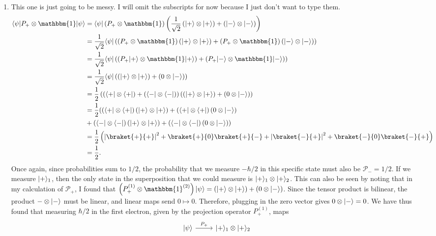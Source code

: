 \documentclass[11pt, letterpaper]{article}
\begin{document}
\begin{enumerate}
	\item This one is just going to be messy. I will omit the subscripts for now because I just don't want to type them.
		\begin{align*}
			\bra{\psi } P_+\otimes \mathbbm{1}\ket{\psi } &=\bra{\psi } \left( P_+ \otimes \mathbbm{1} \right) \left( \frac{1}{\sqrt{2} } \left( \ket{+} \otimes \ket{+} \right) +\left( \ket{-} \otimes \ket{-}  \right)  \right) \\
								      &=\frac{1}{\sqrt{2} } \bra{\psi } \left( \left( P_+\otimes \mathbbm{1} \right) \left( \ket{+} \otimes \ket{+}  \right) + \left( P_+\otimes \mathbbm{1} \right) \left( \ket{-} \otimes \ket{-}  \right)  \right) \\
								      &=\frac{1}{\sqrt{2} } \bra{\psi } \left( \left(P_+\ket{+} \otimes \mathbbm{1}\ket{+}  \right)+\left( P_+\ket{-} \otimes \mathbbm{1}\ket{-}  \right)  \right)\\
								      &=\frac{1}{\sqrt{2} } \bra{\psi } \left(\left( \ket{+} \otimes \ket{+}\right) +\left( 0\otimes \ket{-}  \right)  \right) \\
								      &=\frac{1}{2} \left( \left(\bra{+} \otimes \bra{+} \right)+\left( \bra{-} \otimes \bra{-}  \right)  \right) \left( \left( \ket{+} \otimes \ket{+}  \right) +\left( 0\otimes \ket{-}  \right)  \right) \\
								      &=\frac{1}{2} ( \left( \bra{+} \otimes \bra{+}  \right) \left( \ket{+} \otimes \ket{+}  \right) +\left( \bra{+} \otimes \bra{+}  \right) \left( 0\otimes \ket{-}  \right) \\
								      & +\left( \bra{-} \otimes \bra{-}  \right) \left( \ket{+} \otimes \ket{+}  \right) +\left( \bra{-} \otimes \bra{-}  \right) \left( 0\otimes \ket{-}  \right)  )\\
								      &=\frac{1}{2} \left( \left| \braket{+}{+}  \right|^2+\braket{+}{0} \braket{+}{-} +\left| \braket{-}{+}  \right| ^2+\braket{-}{0} \braket{-}{+}  \right) \\
								      &=\frac{1}{2} 
		.\end{align*}
		Once again, since probabilities sum to $1/2$, the probability that we measure $-\hbar /2$ in this specific state must also be $\mathcal{P}_{-} =1/2$. If we measure $\lvert+\rangle_1$, then the only state in the superposition that we could measure is $\lvert+\rangle_1 \otimes \lvert+\rangle_2$. This can also be seen by noting that in my calculation of $\mathcal{P} _+$, I found that $\left( P_+^{(1)} \otimes \mathbbm{1}^{(2)}  \right) \ket{\psi } =\left( \ket{+} \otimes \ket{+}  \right) +\left( 0\otimes \ket{-}  \right) $. Since the tensor product is bilinear, the product $-\otimes \lvert-\rangle $ must be linear, and linear maps send $0\mapsto 0$. Therefore, plugging in the zero vector gives $0\otimes \lvert-\rangle =0$. We have thus found that measuring $\hbar /2$ in the first electron, given by the projection operator $P_+^{(1)} $, maps
		\[\begin{tikzcd}[row sep = 2.5em, column sep = 2.5em]
			\ket{\psi } \arrow[r, "P_+"]&\ket{+}_1 \otimes \ket{+}_2 
		\end{tikzcd}\]


\end{enumerate}
\end{document}
